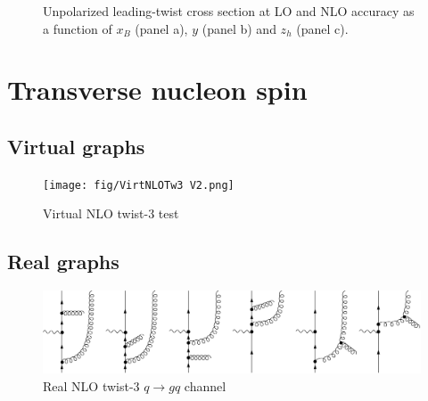 \begin{figure}
    \centering
    \caption{Unpolarized leading-twist cross section at LO and NLO accuracy as a function of $x_B$ (panel a), $y$ (panel b) and $z_h$ (panel c).}
    \label{fig:plotNLOUUU}
\end{figure} 


\clearpage

\section{Transverse nucleon spin}

\subsection{Virtual graphs}
\begin{figure}[ht]
    \centering
    \texttt{[image: fig/VirtNLOTw3 V2.png]}
    \caption{Virtual NLO twist-3 test }
    \label{fig:Virt NLO tw3}
    \end{figure}
\subsection{Real graphs}
\begin{figure}
    \centering
    \includegraphics[width=0.99\linewidth]{fig/RealNLOTw3q2qg.png}
    \caption{Real NLO twist-3 $q\to gq $ channel }
    \label{fig:Real NLO tw3}
\end{figure}


